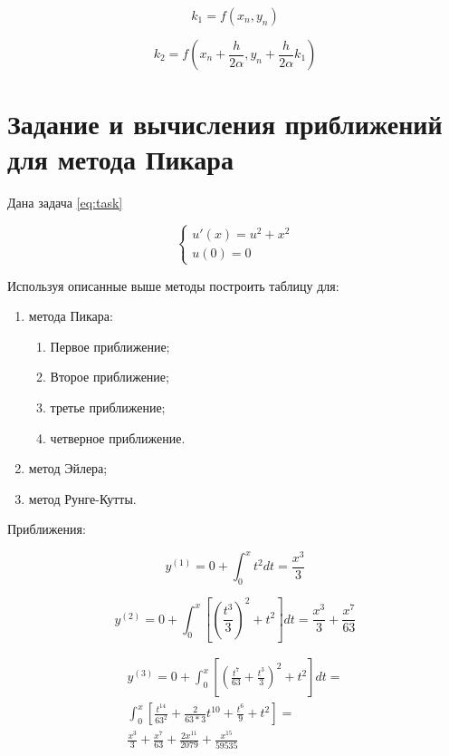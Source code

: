 \begin{equation}
	k_1 = f(x_n, y_n)
	\label{eq:ref5}
\end{equation}

\begin{equation}
	k_2 = f(x_n + \frac{h}{2\alpha}, y_n + \frac{h}{2\alpha}k_1)
	\label{eq:ref6}
\end{equation}

\chapter{Задание и вычисления приближений для метода Пикара}

Дана задача {\ref{eq:task}}

\begin{equation}
	{\begin{cases}
			u'(x) = u^2 + x^2 \\
			u(0) = 0
		\end{cases}}
		\label{eq:task}
\end{equation}

Используя описанные выше методы построить таблицу для:

\begin{enumerate}
	\item метода Пикара:
	\begin{enumerate}
		\item Первое приближение;
		\item Второе приближение;
		\item третье приближение;
		\item четверное приближение.
	\end{enumerate}
	\item метод Эйлера;
	\item метод Рунге-Кутты.
\end{enumerate}

Приближения:

\begin{equation}
	y^{(1)} = 0 + \int_{0}^{x} t^2 dt= \frac{x^3}{3} 
\end{equation}

\begin{equation}
	y^{(2)} = 0 + \int_{0}^{x}\left[ \left( \frac{t^3}{3} \right)^2 + t^2 \right] dt = \frac{x^3}{3} + \frac{x^7}{63}
\end{equation}

\begin{equation}
	\begin{split}
		y^{(3)} = 0 + \int_{0}^{x}\left[ \left(\frac{t^7}{63} + \frac{t^3}{3} \right)^2 + t^2 \right] dt = \\ 
		\int_{0}^{x}\left[ \frac{t^{14}}{63^2} + \frac{2}{63*3}t^{10} + \frac{t^6}{9} + t^2 \right] = \\
		\frac{x^3}{3} + \frac{x^7}{63} + \frac{2x^{11}}{2079} + \frac{x^{15}}{59535}
	\end{split}
\end{equation}

